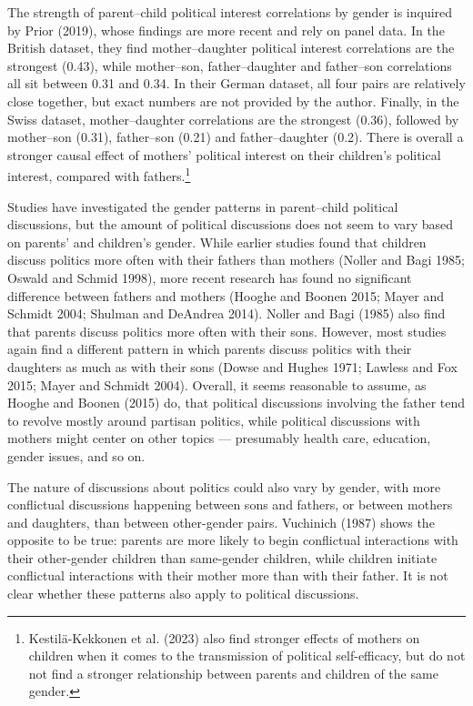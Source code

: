 \documentclass[
  letterpaper,
  DIV=11,
  numbers=noendperiod]{scrreprt}
\begin{document}
The strength of parent--child political interest correlations by gender
is inquired by Prior (2019), whose findings are more recent and rely on
panel data. In the British dataset, they find mother--daughter political
interest correlations are the strongest (0.43), while mother--son,
father--daughter and father--son correlations all sit between 0.31 and
0.34. In their German dataset, all four pairs are relatively close
together, but exact numbers are not provided by the author. Finally, in
the Swiss dataset, mother--daughter correlations are the strongest
(0.36), followed by mother--son (0.31), father--son (0.21) and
father--daughter (0.2). There is overall a stronger causal effect of
mothers' political interest on their children's political interest,
compared with fathers.\footnote{Kestilä-Kekkonen et al. (2023) also find
  stronger effects of mothers on children when it comes to the
  transmission of political self-efficacy, but do not not find a
  stronger relationship between parents and children of the same gender.}

Studies have investigated the gender patterns in parent--child political
discussions, but the amount of political discussions does not seem to
vary based on parents' and children's gender. While earlier studies
found that children discuss politics more often with their fathers than
mothers (Noller and Bagi 1985; Oswald and Schmid 1998), more recent
research has found no significant difference between fathers and mothers
(Hooghe and Boonen 2015; Mayer and Schmidt 2004; Shulman and DeAndrea
2014). Noller and Bagi (1985) also find that parents discuss politics
more often with their sons. However, most studies again find a different
pattern in which parents discuss politics with their daughters as much
as with their sons (Dowse and Hughes 1971; Lawless and Fox 2015; Mayer
and Schmidt 2004). Overall, it seems reasonable to assume, as Hooghe and
Boonen (2015) do, that political discussions involving the father tend
to revolve mostly around partisan politics, while political discussions
with mothers might center on other topics --- presumably health care,
education, gender issues, and so on.

The nature of discussions about politics could also vary by gender, with
more conflictual discussions happening between sons and fathers, or
between mothers and daughters, than between other-gender pairs.
Vuchinich (1987) shows the opposite to be true: parents are more likely
to begin conflictual interactions with their other-gender children than
same-gender children, while children initiate conflictual interactions
with their mother more than with their father. It is not clear whether
these patterns also apply to political discussions.
\end{document}
